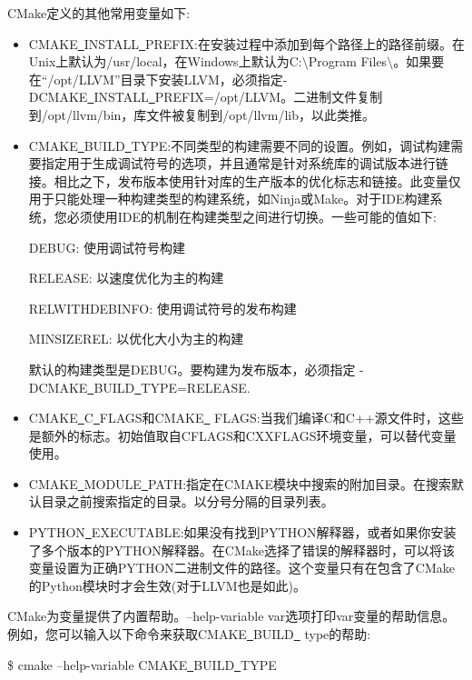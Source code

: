 CMake定义的其他常用变量如下:\par

\begin{itemize}
	\item CMAKE\underline{~}INSTALL\underline{~}PREFIX:在安装过程中添加到每个路径上的路径前缀。在Unix上默认为/usr/local，在Windows上默认为C:$\setminus$Program Files$\setminus$。如果要在“/opt/LLVM”目录下安装LLVM，必须指定-DCMAKE\underline{~}INSTALL\underline{~}PREFIX=/opt/LLVM。二进制文件复制到/opt/llvm/bin，库文件被复制到/opt/llvm/lib，以此类推。
	\item CMAKE\underline{~}BUILD\underline{~}TYPE:不同类型的构建需要不同的设置。例如，调试构建需要指定用于生成调试符号的选项，并且通常是针对系统库的调试版本进行链接。相比之下，发布版本使用针对库的生产版本的优化标志和链接。此变量仅用于只能处理一种构建类型的构建系统，如Ninja或Make。对于IDE构建系统，您必须使用IDE的机制在构建类型之间进行切换。一些可能的值如下:\par
	DEBUG: 使用调试符号构建\par
	RELEASE: 以速度优化为主的构建\par
	RELWITHDEBINFO: 使用调试符号的发布构建\par
	MINSIZEREL: 以优化大小为主的构建\par
	默认的构建类型是DEBUG。要构建为发布版本，必须指定 -DCMAKE\underline{~}BUILD\underline{~}TYPE=RELEASE.\par
	\item CMAKE\underline{~}C\underline{~}FLAGS和CMAKE\underline{~} FLAGS:当我们编译C和C++源文件时，这些是额外的标志。初始值取自CFLAGS和CXXFLAGS环境变量，可以替代变量使用。
	\item CMAKE\underline{~}MODULE\underline{~}PATH:指定在CMAKE模块中搜索的附加目录。在搜索默认目录之前搜索指定的目录。以分号分隔的目录列表。
	\item PYTHON\underline{~}EXECUTABLE:如果没有找到PYTHON解释器，或者如果你安装了多个版本的PYTHON解释器。在CMake选择了错误的解释器时，可以将该变量设置为正确PYTHON二进制文件的路径。这个变量只有在包含了CMake的Python模块时才会生效(对于LLVM也是如此)。
\end{itemize}

CMake为变量提供了内置帮助。--help-variable var选项打印var变量的帮助信息。例如，您可以输入以下命令来获取CMAKE\underline{~}BUILD\underline{~} type的帮助:\par

\begin{tcolorbox}[colback=white,colframe=black]
	\$ cmake --help-variable CMAKE\underline{~}BUILD\underline{~}TYPE
\end{tcolorbox}

